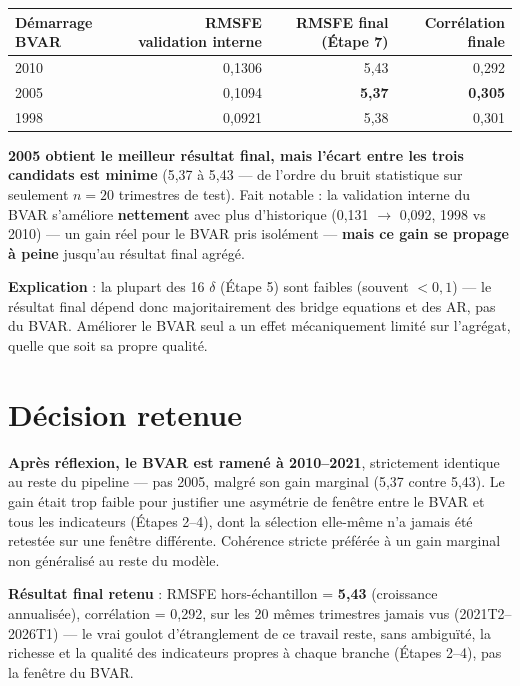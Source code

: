 \documentclass[11pt,a4paper]{article}
\begin{document}
\begin{center}
\begin{tabular}{lrrr}
\toprule
\textbf{Démarrage BVAR} & \textbf{RMSFE validation interne} & \textbf{RMSFE final (Étape 7)} & \textbf{Corrélation finale} \\
\midrule
2010 & 0,1306 & 5,43 & 0,292 \\
2005 & 0,1094 & \textbf{5,37} & \textbf{0,305} \\
1998 & 0,0921 & 5,38 & 0,301 \\
\bottomrule
\end{tabular}
\end{center}

\begin{resultatbox}
\textbf{2005 obtient le meilleur résultat final, mais l'écart entre les trois candidats est minime} (5,37 à 5,43 --- de l'ordre du bruit statistique sur seulement $n=20$ trimestres de test). Fait notable : la validation interne du BVAR s'améliore \textbf{nettement} avec plus d'historique (0,131 $\to$ 0,092, 1998 vs 2010) --- un gain réel pour le BVAR pris isolément --- \textbf{mais ce gain se propage à peine} jusqu'au résultat final agrégé.
\end{resultatbox}

\textbf{Explication} : la plupart des 16 $\delta$ (Étape 5) sont faibles (souvent $<0{,}1$) --- le résultat final dépend donc majoritairement des bridge equations et des AR, pas du BVAR. Améliorer le BVAR seul a un effet mécaniquement limité sur l'agrégat, quelle que soit sa propre qualité.

\section{Décision retenue}

\begin{resultatbox}
\textbf{Après réflexion, le BVAR est ramené à 2010--2021}, strictement identique au reste du pipeline --- pas 2005, malgré son gain marginal (5,37 contre 5,43). Le gain était trop faible pour justifier une asymétrie de fenêtre entre le BVAR et tous les indicateurs (Étapes 2--4), dont la sélection elle-même n'a jamais été retestée sur une fenêtre différente. Cohérence stricte préférée à un gain marginal non généralisé au reste du modèle.

\textbf{Résultat final retenu} : RMSFE hors-échantillon = \textbf{5,43} (croissance annualisée), corrélation = 0,292, sur les 20 mêmes trimestres jamais vus (2021T2--2026T1) --- le vrai goulot d'étranglement de ce travail reste, sans ambiguïté, la richesse et la qualité des indicateurs propres à chaque branche (Étapes 2--4), pas la fenêtre du BVAR.
\end{resultatbox}
\end{document}
